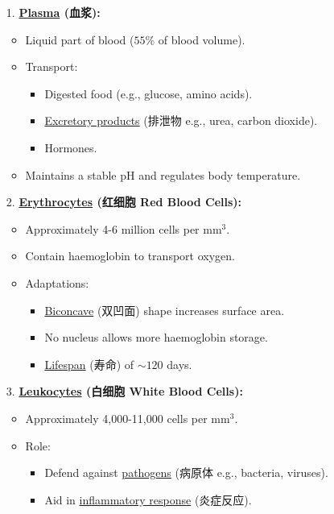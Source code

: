 \begin{itemize}
    \item[1.] \textbf{\underline{Plasma} (血浆):}
    \begin{itemize}
        \item Liquid part of blood ($55\%$ of blood volume).
        \item Transport:
        \begin{itemize}
            \item Digested food (e.g., glucose, amino acids).
            \item \underline{Excretory products} (排泄物 e.g., urea, carbon dioxide).
            \item Hormones.
        \end{itemize}
        \item Maintains a stable pH and regulates body temperature.
    \end{itemize}
    \item[2.] \textbf{\underline{Erythrocytes} (红细胞 Red Blood Cells):}
    \begin{itemize}
        \item Approximately 4-6 million cells per $\text{mm}^3$.
        \item Contain haemoglobin to transport oxygen.
        \item Adaptations:
        \begin{itemize}
            \item \underline{Biconcave} (双凹面) shape increases surface area.
            \item No nucleus allows more haemoglobin storage.
            \item \underline{Lifespan} (寿命) of $\sim 120$ days.
        \end{itemize}
    \end{itemize}
    \item[3.] \textbf{\underline{Leukocytes} (白细胞 White Blood Cells):}
    \begin{itemize}
        \item Approximately 4,000-11,000 cells per $\text{mm}^3$.
        \item Role:
        \begin{itemize}
            \item Defend against \underline{pathogens} (病原体 e.g., bacteria, viruses).
            \item Aid in \underline{inflammatory response} (炎症反应).
        \end{itemize}

\end{itemize}
\end{itemize}
